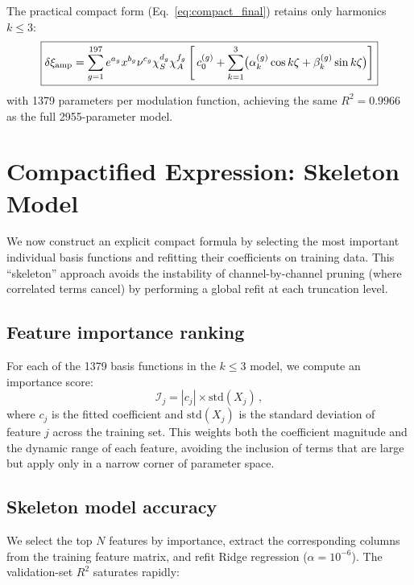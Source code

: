 \documentclass[11pt,letterpaper]{article}
\newcommand{\dxamp}{\delta\xi_{\rm amp}}
\newcommand{\chiS}{\chi_S}
\newcommand{\chiA}{\chi_A}
\begin{document}
\noindent The practical compact form (Eq.~\ref{eq:compact_final}) retains only harmonics $k \leq 3$:
\begin{equation}
\boxed{\dxamp = \sum_{g=1}^{197} e^{a_g} x^{b_g} \nu^{c_g} \chiS^{d_g} \chiA^{f_g} \left[\, c_0^{(g)} + \sum_{k=1}^{3} \bigl(\alpha_k^{(g)} \cos k\zeta + \beta_k^{(g)} \sin k\zeta\bigr) \right]}
\label{eq:compact_final}
\end{equation}
with 1379 parameters per modulation function, achieving the same $R^2 = 0.9966$ as the full 2955-parameter model.

\section{Compactified Expression: Skeleton Model}
\label{sec:skeleton}

We now construct an explicit compact formula by selecting the most important individual basis functions and refitting their coefficients on training data. This ``skeleton'' approach avoids the instability of channel-by-channel pruning (where correlated terms cancel) by performing a global refit at each truncation level.

\subsection{Feature importance ranking}

For each of the 1379 basis functions in the $k \leq 3$ model, we compute an importance score:
\begin{equation}
\mathcal{I}_j = |c_j| \times \text{std}(X_j)\,,
\end{equation}
where $c_j$ is the fitted coefficient and $\text{std}(X_j)$ is the standard deviation of feature $j$ across the training set. This weights both the coefficient magnitude and the dynamic range of each feature, avoiding the inclusion of terms that are large but apply only in a narrow corner of parameter space.

\subsection{Skeleton model accuracy}

We select the top $N$ features by importance, extract the corresponding columns from the training feature matrix, and refit Ridge regression ($\alpha = 10^{-6}$). The validation-set $R^2$ saturates rapidly:
\end{document}
